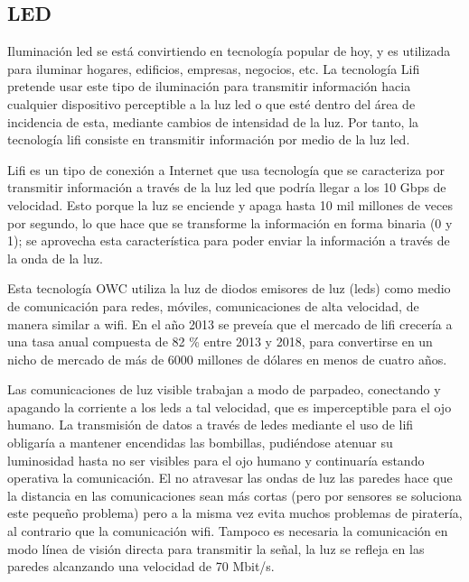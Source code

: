 \documentclass[a4paper]{article}
\begin{document}
\subsection{LED}

Iluminación led se está convirtiendo en tecnología popular de hoy, y es
utilizada para iluminar hogares, edificios, empresas, negocios, etc. La
tecnología Lifi pretende usar este tipo de iluminación para transmitir
información hacia cualquier dispositivo perceptible a la luz led o que
esté dentro del área de incidencia de esta, mediante cambios de
intensidad de la luz. Por tanto, la tecnología lifi consiste en
transmitir información por medio de la luz led.

Lifi es un tipo de conexión a Internet que usa tecnología que se
caracteriza por transmitir información a través de la luz led que podría
llegar a los 10 Gbps de velocidad. Esto porque la luz se enciende y
apaga hasta 10 mil millones de veces por segundo, lo que hace que se
transforme la información en forma binaria (0 y 1); se aprovecha esta
característica para poder enviar la información a través de la onda de
la luz.

Esta tecnología OWC utiliza la luz de diodos emisores de luz (leds) como
medio de comunicación para redes, móviles, comunicaciones de alta
velocidad, de manera similar a wifi. En el año 2013 se preveía que el
mercado de lifi crecería a una tasa anual compuesta de 82 \% entre 2013
y 2018, para convertirse en un nicho de mercado de más de 6000 millones
de dólares en menos de cuatro años.

Las comunicaciones de luz visible trabajan a modo de parpadeo,
conectando y apagando la corriente a los leds a tal velocidad, que es
imperceptible para el ojo humano. La transmisión de datos a través de
ledes mediante el uso de lifi obligaría a mantener encendidas las
bombillas, pudiéndose atenuar su luminosidad hasta no ser visibles para
el ojo humano y continuaría estando operativa la comunicación. El no
atravesar las ondas de luz las paredes hace que la distancia en las
comunicaciones sean más cortas (pero por sensores se soluciona este
pequeño problema) pero a la misma vez evita muchos problemas de
piratería, al contrario que la comunicación wifi. Tampoco es necesaria
la comunicación en modo línea de visión directa para transmitir la
señal, la luz se refleja en las paredes alcanzando una velocidad de 70
Mbit/s.

\noindent{}
\end{document}
